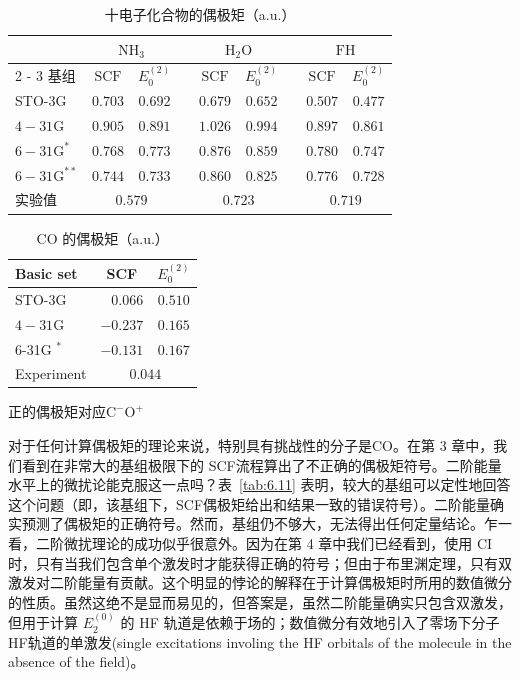 \begin{table}
	\centering
	\caption{十电子化合物的偶极矩（a.u.）}
	\begin{tabular}{lcccccccc}
		\hline & \multicolumn{2}{c}{$\mathrm{NH}_3$} & & \multicolumn{2}{c}{$\mathrm{H}_2 \mathrm{O}$} & & \multicolumn{2}{c}{$\mathrm{FH}$} \\
		\cline { 2 - 3 } \cline { 8 - 9 } \cline { 8 - 9 } 基组 & $\mathrm{SCF}$ & $E_0^{(2)}$ & & $\mathrm{SCF}$ & $E_0^{(2)}$ & & $\mathrm{SCF}$ & $E_0^{(2)}$ \\
		\hline STO-3G & $0.703$ & $0.692$ & & $0.679$ & $0.652$ & & $0.507$ & $0.477$ \\
		$4-31 \mathrm{G}$ & $0.905$ & $0.891$ & & $1.026$ & $0.994$ & & $0.897$ & $0.861$ \\
		$6-31 \mathrm{G}^*$ & $0.768$ & $0.773$ & & $0.876$ & $0.859$ & & $0.780$ & $0.747$ \\
		$6-31 \mathrm{G}^{* *}$ & $0.744$ & $0.733$ & & $0.860$ & $0.825$ & & $0.776$ & $0.728$ \\
		实验值 & \multicolumn{2}{c}{$0.579$} & & \multicolumn{2}{c}{$0.723$} & & \multicolumn{2}{c}{$0.719$} \\
		\hline
	\end{tabular}
	\label{tab:6.10}
\end{table}

\begin{table}
	\centering
	\caption{CO 的偶极矩（a.u.）}
	\begin{threeparttable}
		\begin{tabular}{lrc}
			\hline Basic set & \multicolumn{1}{c}{ SCF } & $E_0^{(2)}$ \\
			\hline STO-3G & $0.066$ & $0.510$ \\
			$4-31 \mathrm{G}$ & $-0.237$ & $0.165$ \\
			6-31G $^*$ & $-0.131$ & $0.167$ \\
			Experiment & \multicolumn{2}{c}{$0.044$} \\
			\hline
		\end{tabular}
		\begin{tablenotes}
			\item[a] 正的偶极矩对应$\mathrm{C^-O^+}$
		\end{tablenotes}
	\end{threeparttable}
	\label{tab:6.11}
\end{table}

对于任何计算偶极矩的理论来说，特别具有挑战性的分子是CO。在第 3 章中，我们看到在非常大的基组极限下的 SCF流程算出了不正确的偶极矩符号。二阶能量水平上的微扰论能克服这一点吗？表~\autoref{tab:6.11} 表明，较大的基组可以定性地回答这个问题（即，该基组下，SCF偶极矩给出和结果一致的错误符号）。二阶能量确实预测了偶极矩的正确符号。然而，基组仍不够大，无法得出任何定量结论。乍一看，二阶微扰理论的成功似乎很意外。因为在第 4 章中我们已经看到，使用 CI时，只有当我们包含单个激发时才能获得正确的符号；但由于布里渊定理，只有双激发对二阶能量有贡献。这个明显的悖论的解释在于计算偶极矩时所用的数值微分的性质。虽然这绝不是显而易见的，但答案是，虽然二阶能量确实只包含双激发，但用于计算 $E_2^{(0)}$ 的 HF 轨道是依赖于场的；数值微分有效地引入了零场下分子HF轨道的单激发(single excitations involing the HF orbitals of the molecule in the absence of the field)。


